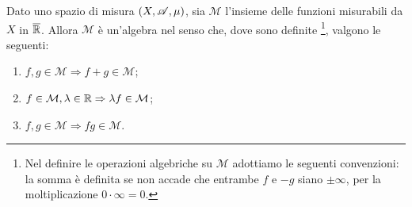 \begin{proposition}\label{prop:AlgMis}
	Dato uno spazio di misura $(X,\mathscr A,\mu)$, sia $\mathcal{M}$ l'insieme delle funzioni misurabili da $X$ in $\overline{\mathbb R}$.
	Allora $\mathcal{M}$ è un'algebra nel senso che, dove sono definite \footnote{Nel definire le operazioni algebriche su $\mathcal{M}$ adottiamo le seguenti convenzioni: la somma è definita
		se non accade che entrambe $f$ e $-g$ siano $\pm\infty$, per la moltiplicazione $0\cdot \infty = 0$.},
	valgono le seguenti:
	\begin{enumerate}[label=(\arabic*),ref=(\arabic*)]
		\item $f,g\in \mathcal{M} \Rightarrow f+g\in \mathcal{M}$; \label{AlM:sum}
		\item $f\in \mathcal{M}, \lambda \in \mathbb R \Rightarrow \lambda f\in \mathcal{M}$; \label{AlM:sca}
		\item $f,g\in \mathcal{M} \Rightarrow fg\in \mathcal{M}$. \label{AlM:pro}
	\end{enumerate}
\end{proposition}

